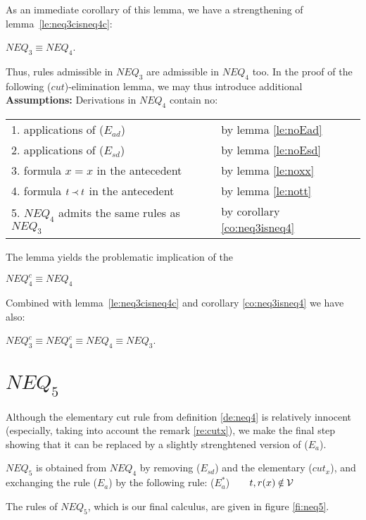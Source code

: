 %
\noindent
As an immediate corollary of this lemma, we have a strengthening of 
lemma~\ref{le:neq3cisneq4c}: 
\begin{COROLLARY}\label{co:neq3isneq4}
$NEQ_3\equiv NEQ_4$.
\end{COROLLARY}
Thus, rules admissible in $NEQ_3$ are admissible in $NEQ_4$ too.
In the proof of the following ($cut$)-elimination lemma, 
we may thus introduce additional
\\[1ex]
\noindent
{\bf Assumptions:} Derivations in $NEQ_4$ contain no:

\begin{tabular}{ll}
1. applications of ($E_{ad}$) & by lemma \ref{le:noEad} \\
2. applications of ($E_{sd}$) & by lemma \ref{le:noEsd} \\
3. formula $x=x$ in the antecedent & by lemma \ref{le:noxx} \\
4. formula $t\mathbin{\prec} t$ in the antecedent & by lemma \ref{le:nott} \\
5. $NEQ_4$ admits the same rules as $NEQ_3$ & by corollary \ref{co:neq3isneq4}
\end{tabular} 


%
\noindent
The lemma yields the problematic implication of the 
\begin{THEOREM}\label{th:neq4cisneq4}
 $NEQ_4^c \equiv NEQ_4$ \end{THEOREM}
Combined with lemma~\ref{le:neq3cisneq4c} and corollary \ref{co:neq3isneq4} 
we have also:
\begin{COROLLARY}
$NEQ_3^c \equiv NEQ_4^c \equiv NEQ_4 \equiv NEQ_3$.
\end{COROLLARY}

\section{$NEQ_5$}\label{se:lastNEQ}
Although the elementary cut rule  from definition \ref{de:neq4}
is relatively innocent (especially, taking into account the remark
\ref{re:cutx}), we make the final step showing that it can be replaced by a
slightly strenghtened version of ($E_a$).
\begin{DEFINITION}\label{de:neq5}
 $NEQ_5$ is obtained from $NEQ_4$ by removing ($E_{sd}$) and the elementary
 ($cut_x$), and exchanging the rule ($E_a$) by the following rule:
 ($E_a^*$)\ \ \ \ $t,r(x)\not\in\Vars$
\end{DEFINITION}
The rules of $NEQ_5$, which is our final calculus, are given in figure \ref{fi:neq5}.

